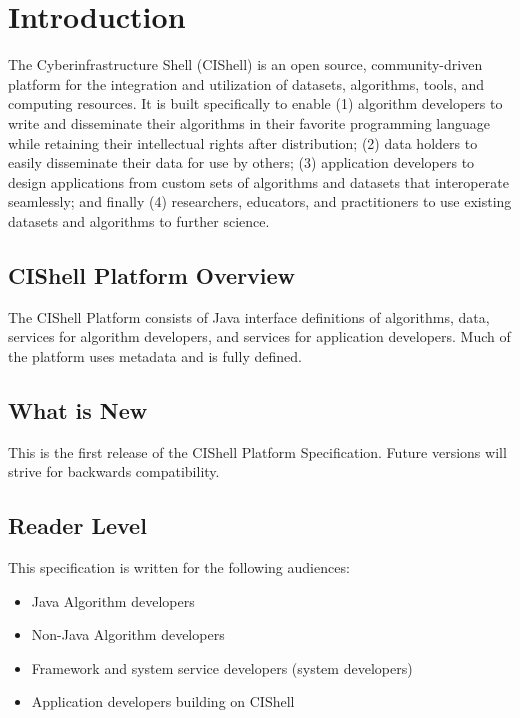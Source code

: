 \chapter{Introduction}

The Cyberinfrastructure Shell (CIShell) is an open source, community-driven
platform for the integration and utilization of datasets, algorithms, tools, and
computing resources. It is built specifically to enable (1) algorithm developers
to write and disseminate their algorithms in their favorite programming language
while retaining their intellectual rights after distribution; (2) data holders to
easily disseminate their data for use by others; (3) application developers to
design applications from custom sets of algorithms and datasets that interoperate
seamlessly; and finally (4) researchers, educators, and practitioners to use
existing datasets and algorithms to further science.

\section{CIShell Platform Overview}

The CIShell Platform consists of Java interface definitions of algorithms, data,
services for algorithm developers, and services for application developers. Much
of the platform uses metadata and is fully defined.

\section{What is New}

This is the first release of the CIShell Platform Specification. Future
versions will strive for backwards compatibility.

\section{Reader Level}

This specification is written for the following audiences:
\begin{itemize}
  \item Java Algorithm developers
  \item Non-Java Algorithm developers
  \item Framework and system service developers (system developers)
  \item Application developers building on CIShell
\end{itemize}

